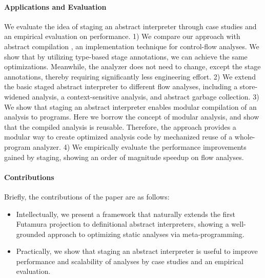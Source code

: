 \paragraph{Applications and Evaluation}
We evaluate the idea of staging an abstract interpreter through
case studies and an empirical evaluation on performance.
1) We compare our approach with abstract compilation
\cite{Boucher:1996:ACN:647473.727587}, an implementation technique for
control-flow analyses. We show that by utilizing type-based stage
annotations, we can achieve the same optimizations. Meanwhile,
the analyzer does not need to change, except the stage annotations, 
thereby requiring significantly less engineering effort.
2) We extend the basic staged abstract interpreter to different flow
analyses, including a store-widened analysis, a context-sensitive
analysis, and abstract garbage collection.
3) We show that staging an abstract interpreter enables modular
compilation of an analysis to programs. Here we borrow the concept of
modular analysis, and show that the compiled analysis is reusable.
Therefore, the approach provides a modular way to create optimized
analysis code by mechanized reuse of a whole-program analyzer.
4) We empirically evaluate the performance improvements gained by staging,
showing an order of magnitude speedup on flow analyses.

\paragraph{Contributions} Briefly, the contributions of the paper are as follows:
\begin{itemize}[leftmargin=2em]
  \item Intellectually, we present a framework that naturally extends the first
    Futamura projection to definitional abstract interpreters, showing a
    well-grounded approach to optimizing static analyses via meta-programming.
  \item Practically, we show that staging an abstract interpreter is useful to
    improve performance and scalability of analyses by case studies and an
    empirical evaluation.
\end{itemize}


